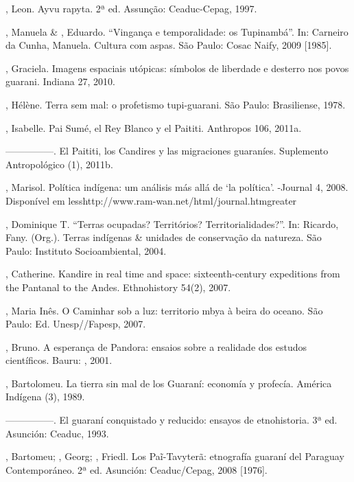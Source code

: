 \begin{Parskip}
, Leon. Ayvu rapyta. 2ª ed. Assunção: Ceaduc-Cepag, 1997.

  , Manuela \&   , Eduardo.
``Vingança e temporalidade: os Tupinambá''. In: Carneiro da Cunha,
Manuela. Cultura com aspas. São Paulo: Cosac Naify, 2009 [1985].

, Graciela. Imagens espaciais utópicas: símbolos de
liberdade e desterro nos povos guarani. Indiana 27, 2010. 

, Hélène. Terra sem mal: o profetismo tupi-guarani. São
Paulo: Brasiliense, 1978.

, Isabelle. Pai Sumé, el Rey Blanco y el Paititi. Anthropos
106, 2011a.

—————. El Paititi, los Candires y las migraciones guaraníes.
Suplemento Antropológico  (1), 2011b.

  , Marisol. Política indígena: um análisis más allá de
‘la política’. -Journal 4, 2008. Disponível em
{less}http://www.ram-wan.net/html/journal.htm{greater}

, Dominique T. ``Terras ocupadas? Territórios?
Territorialidades?''. In: Ricardo, Fany. (Org.). Terras indígenas \&
unidades de conservação da natureza. São Paulo: Instituto
Socioambiental, 2004.

, Catherine. Kandire in real time and space:
sixteenth-century expeditions from the Pantanal to the Andes.
Ethnohistory 54(2), 2007.

, Maria Inês. O Caminhar sob a luz: territorio mbya à beira
do oceano. São Paulo: Ed. Unesp//Fapesp, 2007.

, Bruno. A esperança de Pandora: ensaios sobre a realidade
dos estudos científicos. Bauru: , 2001.

, Bartolomeu. La tierra sin mal de los Guaraní: economía y
profecía. América Indígena  (3), 1989.

—————. El guaraní conquistado y reducido: ensayos de etnohistoria.
3ª ed. Asunción: Ceaduc, 1993.

, Bartomeu; , Georg; , Friedl. Los
Paĩ{}-Tavyterã: etnografía guaraní del Paraguay Contemporáneo. 2ª
ed. Asunción: Ceaduc/Cepag, 2008 [1976].


\end{Parskip}
